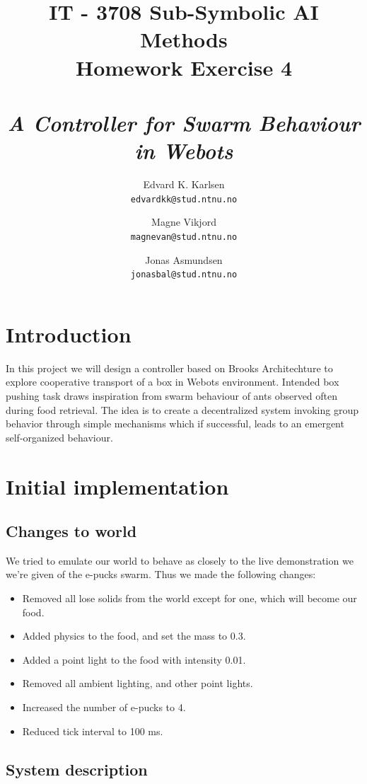 \documentclass[a4paper,10pt]{article}
\title{
    IT - 3708 Sub-Symbolic AI Methods \\
    Homework Exercise 4\\
    ~\\
    \emph{A Controller for Swarm Behaviour in Webots}
}
\author{
    Edvard K. Karlsen \\
    \texttt{edvardkk@stud.ntnu.no}
    \and
    Magne Vikjord \\
    \texttt{magnevan@stud.ntnu.no}
    \and
    Jonas Asmundsen \\
    \texttt{jonasbal@stud.ntnu.no}
}
\date {}
\newcommand{\numbots}{4}
\newcommand{\foodmass}{0.3}
\newcommand{\lightintensity}{0.01}
\newcommand{\tickinterval}{100 ms}
\begin{document}
\maketitle

\section{Introduction}

In this project we will design a controller based on Brooks Architechture to explore
cooperative transport of a box in Webots environment. Intended box pushing task draws 
inspiration from swarm behaviour of ants observed often during food retrieval. The
idea is to create a decentralized system invoking group behavior through simple 
mechanisms which if successful, leads to an emergent self-organized behaviour.

\section{Initial implementation}

\subsection{Changes to world}
We tried to emulate our world to behave as closely to the live demonstration we
we're given of the e-pucks swarm. Thus we made the following changes:

\begin{itemize}
\item Removed all lose solids from the world except for one, which will become our food.
\item Added physics to the food, and set the mass to \foodmass.
\item Added a point light to the food with intensity \lightintensity.
\item Removed all ambient lighting, and other point lights.
\item Increased the number of e-pucks to \numbots.
\item Reduced tick interval to \tickinterval.
\end{itemize}

\subsection{System description}
\end{document}
